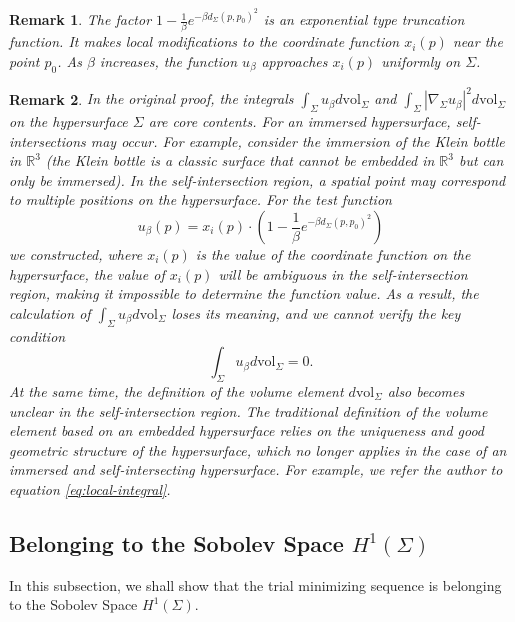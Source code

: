 \documentclass[a4, 12pt]{amsart}
\numberwithin{equation}{section} \numberwithin{equation}{section}
\newtheorem{rem}{Remark}[section]{\bfseries\upshape}
\begin{document}
\begin{rem}The factor $1-\frac{1}{\beta} e^{-\beta d_{\Sigma}\left(p, p_{0}\right)^{2}}$ is an exponential type truncation function. It makes local modifications to the coordinate function $x_{i}(p)$ near the point $p_{0}$. As $\beta$ increases, the function $u_{\beta}$ approaches $x_{i}(p)$ uniformly on $\Sigma$.\end{rem}


\begin{rem}In the original proof, the integrals $\int_{\Sigma} u_{\beta} d \mathrm{vol}_{\Sigma}$ and $\int_{\Sigma}\left|\nabla_{\Sigma} u_{\beta}\right|^{2} d \mathrm{vol}_{\Sigma}$ on the hypersurface $\Sigma$ are core contents. For an immersed hypersurface, self-intersections may occur. For example, consider the immersion of the Klein bottle in $\mathbb{R}^{3}$ (the Klein bottle is a classic surface that cannot be embedded in $\mathbb{R}^{3}$ but can only be immersed). In the self-intersection region, a spatial point may correspond to multiple positions on the hypersurface. For the test function \begin{equation*}u_{\beta}(p)=x_{i}(p) \cdot\left(1-\frac{1}{\beta} e^{-\beta d_{\Sigma}\left(p, p_{0}\right)^{2}}\right)\end{equation*} we constructed, where $x_{i}(p)$ is the value of the coordinate function on the hypersurface, the value of $x_{i}(p)$ will be ambiguous in the self-intersection region, making it impossible to determine the function value. As a result, the calculation of $\int_{\Sigma} u_{\beta} d \mathrm{vol}_{\Sigma}$ loses its meaning, and we cannot verify the key condition $$\int_{\Sigma} u_{\beta} d \mathrm{vol}_{\Sigma}=0.$$ At the same time, the definition of the volume element $d \mathrm{vol}_{\Sigma}$ also becomes unclear in the self-intersection region. The traditional definition of the volume element based on an embedded
hypersurface relies on the uniqueness and good geometric structure of the hypersurface, which no longer applies in the case of an immersed and self-intersecting hypersurface. For example, we refer the author to equation \eqref{eq:local-integral}. \end{rem}


\subsection{Belonging to the Sobolev Space $H^{1}(\Sigma)$}
In this subsection, we shall  show that the trial minimizing sequence is belonging to the Sobolev Space $H^{1}(\Sigma)$.
\end{document}
